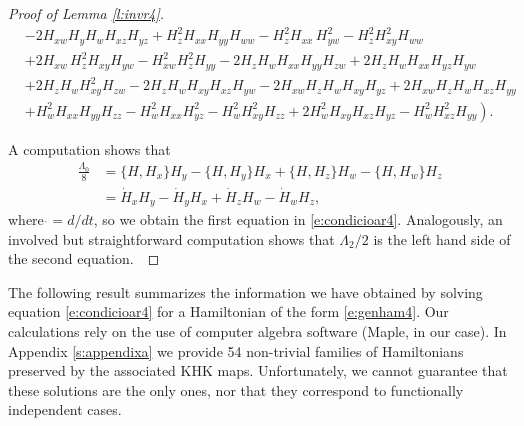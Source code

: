 \documentclass[11pt]{article}
\begin{document}
\begin{proof}[Proof of Lemma \ref{l:invr4}]
\begin{align*}
& -2 H_{xw} H_{y} H_{w} H_{xz} H_{yz} + H_{z}^{2} H_{xx} H_{yy} H_{ww}- H_{z}^{2} H_{xx} \,H_{yw}^{2}- H_{z}^{2} H_{xy}^{2} H_{ww} \\
&+2 H_{xw} \,H_{z}^{2} H_{xy} H_{yw} - H_{xw}^{2} H_{z}^{2} H_{yy}-2 H_{z} H_{w} H_{xx} H_{yy} H_{zw} +2 H_{z} H_{w} H_{xx} H_{yz} H_{yw} \\
 &+2 H_{z} H_{w} H_{xy}^{2} H_{zw} -2 H_{z} H_{w} H_{xy} H_{xz} H_{yw}-2 H_{xw} H_{z} H_{w} H_{xy} H_{yz} +2 H_{xw} H_{z} H_{w} H_{xz} H_{yy} \\
 &\left.+ H_{w}^{2} H_{xx} H_{yy} H_{zz} - H_{w}^{2} H_{xx} H_{yz}^{2}- H_{w}^{2} H_{xy}^{2} H_{zz} +2 H_{w}^{2} H_{xy} H_{xz} H_{yz} - H_{w}^{2} H_{xz}^{2} H_{yy}\right).
\end{align*}

A computation shows that
\begin{align*}
  \frac{\Lambda_0}{8}&=\{H,H_x\}H_y-\{H,H_y\}H_x+\{H,H_z\}H_w-\{H,H_w\}H_z\\
  &=\dot{H}_xH_y-\dot{H}_yH_x+\dot{H}_zH_w-\dot{H}_wH_z,
\end{align*}
where $\dot{}=d/dt$, so we obtain the first equation in \eqref{e:condicioar4}.
Analogously, an involved but straightforward computation shows that
  $\Lambda_2/2$ is the left hand side of the second equation.~\end{proof}
  
The following result summarizes the information we have obtained by solving equation \eqref{e:condicioar4} for a Hamiltonian of the form \eqref{e:genham4}.
Our calculations rely on the use of computer algebra software (Maple, in our case). In Appendix \ref{s:appendixa} we provide 54 non-trivial families of Hamiltonians preserved by the associated KHK maps. Unfortunately, we cannot guarantee that these solutions are the only ones, nor that they correspond to functionally independent cases.
\end{document}
